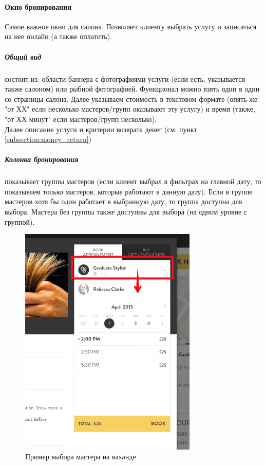 \documentclass[DIV=calc, paper=a4, fontsize=11pt]{scrartcl} %
\begin{document}
\paragraph{Окно бронирования}\label{paragraph:app_booking}
Самое важное окно для салона. Позволяет клиенту выбрать услугу и записаться на нее онлайн (а также оплатить).

\subparagraph{Общий вид} состоит из: области баннера с фотографиями услуги (если есть, указывается также салоном) или рыбной фотографией. Функционал можно взять один в один со страницы салона. Далее указываем стоимость в текстовом формате (опять же "от ХХ" если несколько мастеров/групп оказывают эту услугу) и время (также, "от ХХ минут" если мастеров/групп несколько).
\\[0.5cm]
Далее описание услуги и критерии возврата денег (см. пункт \ref{subsection:money_return})

\subparagraph{Колонка бронирования} показывает группы мастеров (если клиент выбрал в фильтрах на главной дату, то показываем только мастеров, которые работают в данную дату). Если в группе мастеров хотя бы один работает в выбранную дату, то группа доступна для выбора. Мастера без группы также доступны для выбора (на одном уровне с группой).

\begin{figure}[H]
        \centering
        \includegraphics[width=320px]{before_booking.png}
        \caption{Пример выбора мастера на ваханде\label{fig:before_booking.png}}
        \end{figure}
        
\end{document}
